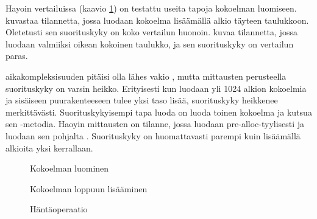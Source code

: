 Hayoin vertailuissa (kaavio \ref{kokoelmanLuominen_kaavio}) on testattu useita tapoja kokoelman luomiseen.  kuvastaa tilannetta, jossa luodaan kokoelma lisäämällä alkio täyteen taulukkoon. Oletetusti sen suorituskyky on koko vertailun huonoin.  kuvaa tilannetta, jossa luodaan valmiiksi oikean kokoinen taulukko, ja sen suorituskyky on vertailun paras.

 aikakompleksisuuden pitäisi olla lähes vakio \cite{scalaCollections}, mutta mittausten perusteella suorituskyky on varsin heikko. Erityisesti kun luodaan yli 1024 alkion kokoelmia ja sisäiseen puurakenteeseen tulee yksi taso lisää, suorituskyky heikkenee merkittävästi. Suorituskykyisempi tapa luoda  on luoda toinen kokoelma ja kutsua sen -metodia. Haoyin mittausten  on tilanne, jossa luodaan  pre-alloc-tyylisesti ja luodaan sen pohjalta . Suorituskyky on huomattavasti parempi kuin lisäämällä alkioita yksi kerrallaan.




\begin{figure}[h]
    \centering
    
    \caption{Kokoelman luominen}\label{kokoelmanLuominen_kaavio}
\end{figure}

\begin{figure}[h]
    \centering
    
    \caption{Kokoelman loppuun lisääminen}\label{kokoelmanLoppuunLisaaminen_kaavio}
\end{figure}

\begin{figure}[h]
    \centering
    
    \caption{Häntäoperaatio}\label{hantaoperaatio_kaavio}
\end{figure}
